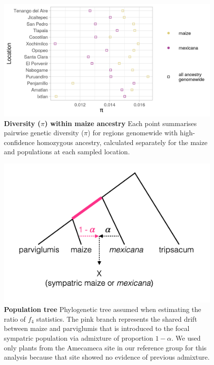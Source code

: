 \begin{figure}[ht]
\includegraphics[width=\textwidth]{chapter2/figures/pi_within_maize_ancestry.png}
\caption{\color{Gray} \textbf{Diversity ($\pi$) within maize ancestry} Each point summarises pairwise genetic diversity ($\pi$) for regions genomewide with high-confidence homozygous \mexicana ancestry, calculated separately for the maize and \mexicana populations at each sampled location.}
\label{pi_maize_ancestry}
\end{figure}

\begin{figure}[ht]
\includegraphics[width=\textwidth]{chapter2/figures/tree_f4_stats.png}
\caption{\color{Gray} \textbf{Population tree} Phylogenetic tree assumed when estimating the ratio of $f_4$ statistics. The pink branch represents the shared drift between maize and parviglumis that is introduced to the focal sympatric population via admixture of proportion $1 - \alpha$. We used only plants from the Amecameca site in our \mexicana reference group for this analysis because that site showed no evidence of previous admixture.}
\label{f4_tree}
\end{figure}

